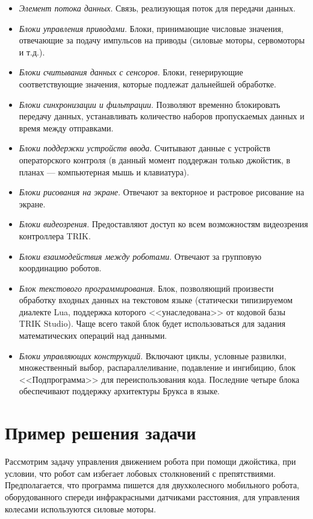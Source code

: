 \documentclass[conference]{IEEEtran}
\begin{document}
\begin{itemize}
\item \textit{Элемент потока данных}. Связь, реализующая поток для передачи данных. 
\item \textit{Блоки управления приводами}. Блоки, принимающие числовые значения, отвечающие за подачу импульсов на приводы (силовые моторы, сервомоторы и т.д.).
\item \textit{Блоки считывания данных с сенсоров}. Блоки, генерирующие соответствующие значения, которые подлежат дальнейшей обработке.
\item \textit{Блоки синхронизации и фильтрации}. Позволяют временно блокировать передачу данных, устанавливать количество наборов пропускаемых данных и время между отправками. 
\item \textit{Блоки поддержки устройств ввода}. Считывают данные с устройств операторского контроля (в данный момент поддержан только джойстик, в планах --- компьютерная мышь и клавиатура). 
\item \textit{Блоки рисования на экране}. Отвечают за векторное и растровое рисование на экране.
\item \textit{Блоки видеозрения}. Предоставляют доступ ко всем возможностям видеозрения контроллера TRIK.
\item \textit{Блоки взаимодействия между роботами}. Отвечают за групповую координацию роботов.
\item \textit{Блок текстового программирования}. Блок, позволяющий произвести обработку входных данных на текстовом языке (статически типизируемом диалекте Lua, поддержка которого <<унаследована>> от кодовой базы TRIK Studio). Чаще всего такой блок будет использоваться для задания математических операций над данными.
\item \textit{Блоки управляющих конструкций}. Включают циклы, условные развилки, множественный выбор, распараллеливание, подавление и ингибицию, блок <<Подпрограмма>> для переиспользования кода. Последние четыре блока обеспечивают поддержку архитектуры Брукса в языке.

\end{itemize}

\section{Пример решения задачи}
\label{sec:example}
Рассмотрим задачу управления движением робота при помощи джойстика, при условии, что робот сам избегает лобовых столкновений с препятствиями. Предполагается, что программа пишется для двухколесного мобильного робота, оборудованного спереди инфракрасными датчиками расстояния, для управления колесами используются силовые моторы.
\end{document}
